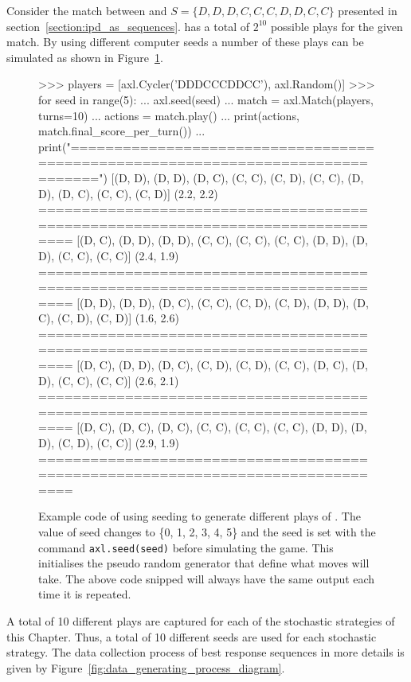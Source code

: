 Consider the match between \Random and \(S = \{D, D, D, C, C, C, D, D, C, C\}\)
presented in section~\ref{section:ipd_as_sequences}. \Random has a total of
\(2^{10}\) possible plays for the given match. By using different computer seeds a number of these
plays can be simulated as shown in Figure~\ref{fig:random_apl_example}.

\begin{figure}[!htbp]
    \begin{usagepy}
>>> players = [axl.Cycler('DDDCCCDDCC'), axl.Random()]
>>> for seed in range(5):
...   axl.seed(seed)
...   match = axl.Match(players, turns=10)
...   actions = match.play()
...   print(actions, match.final_score_per_turn())
...   print("================================================================================")
[(D, D), (D, D), (D, C), (C, C), (C, D), (C, C), (D, D), (D, C), (C, C), (C, D)] (2.2, 2.2)
================================================================================
[(D, C), (D, D), (D, D), (C, C), (C, C), (C, C), (D, D), (D, D), (C, C), (C, C)] (2.4, 1.9)
================================================================================
[(D, D), (D, D), (D, C), (C, C), (C, D), (C, D), (D, D), (D, C), (C, D), (C, D)] (1.6, 2.6)
================================================================================
[(D, C), (D, D), (D, C), (C, D), (C, D), (C, C), (D, C), (D, D), (C, C), (C, C)] (2.6, 2.1)
================================================================================
[(D, C), (D, C), (D, C), (C, C), (C, C), (C, C), (D, D), (D, D), (C, D), (C, C)] (2.9, 1.9)
================================================================================

\end{usagepy}
\caption{Example code of using seeding to generate different plays of \Random.
The value of seed changes to \{0, 1, 2, 3, 4, 5\} and the seed is set with
the command \texttt{axl.seed(seed)} before simulating the game. This initialises the
pseudo random generator that define what moves \Random will take.
The above code snipped will always have the same output each time it is
repeated.}\label{fig:random_apl_example}
\end{figure}

\newpage

A total of 10 different plays are captured for each of the stochastic strategies
of this Chapter. Thus, a total of 10 different seeds are used for each
stochastic strategy. The data collection process of best response sequences in
more details is given by Figure~\ref{fig:data_generating_process_diagram}.

